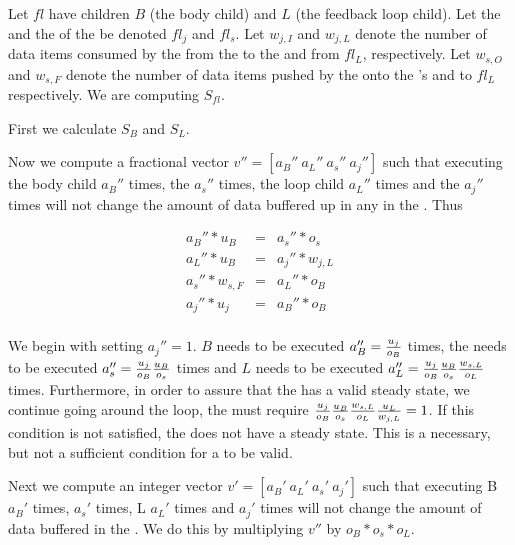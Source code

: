 Let {{\feedbackloop}} $fl$ have children $B$ (the body child) and
$L$ (the feedback loop child). Let the {\joiner} and the
{\splitter} of the {{\feedbackloop}} be denoted $fl_j$ and $fl_s$.
Let $w_{j,I}$ and $w_{j,L}$ denote the number of data items
consumed by the {\joiner} from the {\Input} {{\Channel}} to the
{{\feedbackloop}} and from $fl_L$, respectively.  Let $w_{s,O}$ and
$w_{s,F}$ denote the number of data items pushed by the
{\splitter} onto the {{\feedbackloop}}'s {\Input} {{\Channel}} and
to $fl_L$ respectively.  We are computing $S_{fl}$.

First we calculate $S_{B}$ and $S_{L}$.

Now we compute a fractional vector $v'' = [a_B''\ a_L''\ a_s''\
a_j'']$ such that executing the body child $a_B''$ times, the
{\splitter} $a_s''$ times, the loop child $a_L''$ times and the
{\joiner} $a_j''$ times will not change the amount of data
buffered up in any {\Channel} in the {{\feedbackloop}}.  Thus

\begin{displaymath}
\begin{array}{rcl}
a_B'' * u_B & = & a_s'' * o_s \\
a_L'' * u_B & = & a_j'' * w_{j, L} \\
a_s'' * w_{s, F} & = & a_L'' * o_B \\
a_j'' * u_j & = & a_B'' * o_B \\
\end{array}
\end{displaymath}

We begin with setting $a_j'' = 1$. $B$ needs to be executed $a_B''
= {u_j \over o_B}$ times, the {\splitter} needs to be executed
$a_s'' = {u_j \over o_B}{u_B \over o_s}$ times and $L$ needs to be
executed $a_L'' = {u_j \over o_B}{u_B \over o_s}{w_{s,L} \over
o_L}$ times. Furthermore, in order to assure that the
{{\feedbackloop}} has a valid steady state, we continue going
around the loop, the {\joiner} must require ${u_j \over o_B}{u_B
\over o_s}{w_{s,L} \over o_L}{u_L \over w_{j,L}} = 1$.  If this
condition is not satisfied, the {{\feedbackloop}} does not have a
steady state. This is a necessary, but not a sufficient condition
for a {{\feedbackloop}} to be valid.

Next we compute an integer vector $v' = [a_B'\ a_L'\ a_s'\ a_j']$
such that executing B $a_B'$ times, {\splitter} $a_s'$ times, L
$a_L'$ times and {\joiner} $a_j'$ times will not change the amount
of data buffered in the {\splitjoin}. We do this by multiplying
$v''$ by $o_B * o_s * o_L$.

